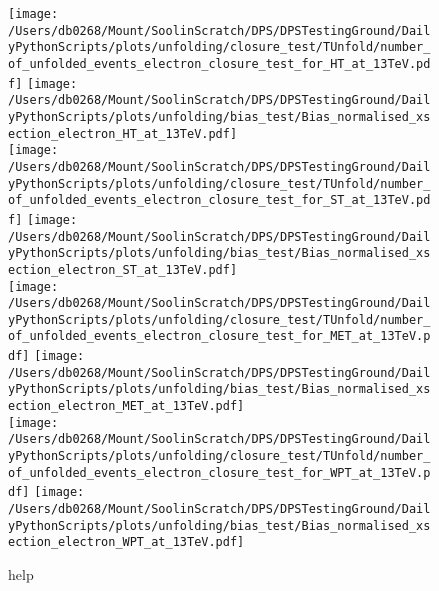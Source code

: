 \begin{figure*}[htpb]
	\centering
	\texttt{[image: /Users/db0268/Mount/SoolinScratch/DPS/DPSTestingGround/DailyPythonScripts/plots/unfolding/closure\_test/TUnfold/number\_of\_unfolded\_events\_electron\_closure\_test\_for\_HT\_at\_13TeV.pdf]}
	\texttt{[image: /Users/db0268/Mount/SoolinScratch/DPS/DPSTestingGround/DailyPythonScripts/plots/unfolding/bias\_test/Bias\_normalised\_xsection\_electron\_HT\_at\_13TeV.pdf]} \\
	\texttt{[image: /Users/db0268/Mount/SoolinScratch/DPS/DPSTestingGround/DailyPythonScripts/plots/unfolding/closure\_test/TUnfold/number\_of\_unfolded\_events\_electron\_closure\_test\_for\_ST\_at\_13TeV.pdf]}
	\texttt{[image: /Users/db0268/Mount/SoolinScratch/DPS/DPSTestingGround/DailyPythonScripts/plots/unfolding/bias\_test/Bias\_normalised\_xsection\_electron\_ST\_at\_13TeV.pdf]} \\
	\texttt{[image: /Users/db0268/Mount/SoolinScratch/DPS/DPSTestingGround/DailyPythonScripts/plots/unfolding/closure\_test/TUnfold/number\_of\_unfolded\_events\_electron\_closure\_test\_for\_MET\_at\_13TeV.pdf]}
	\texttt{[image: /Users/db0268/Mount/SoolinScratch/DPS/DPSTestingGround/DailyPythonScripts/plots/unfolding/bias\_test/Bias\_normalised\_xsection\_electron\_MET\_at\_13TeV.pdf]} \\
	\texttt{[image: /Users/db0268/Mount/SoolinScratch/DPS/DPSTestingGround/DailyPythonScripts/plots/unfolding/closure\_test/TUnfold/number\_of\_unfolded\_events\_electron\_closure\_test\_for\_WPT\_at\_13TeV.pdf]}
	\texttt{[image: /Users/db0268/Mount/SoolinScratch/DPS/DPSTestingGround/DailyPythonScripts/plots/unfolding/bias\_test/Bias\_normalised\_xsection\_electron\_WPT\_at\_13TeV.pdf]} \\
	\caption[help]{help}
	\label{fig:ClosureBiase1}
\end{figure*}

